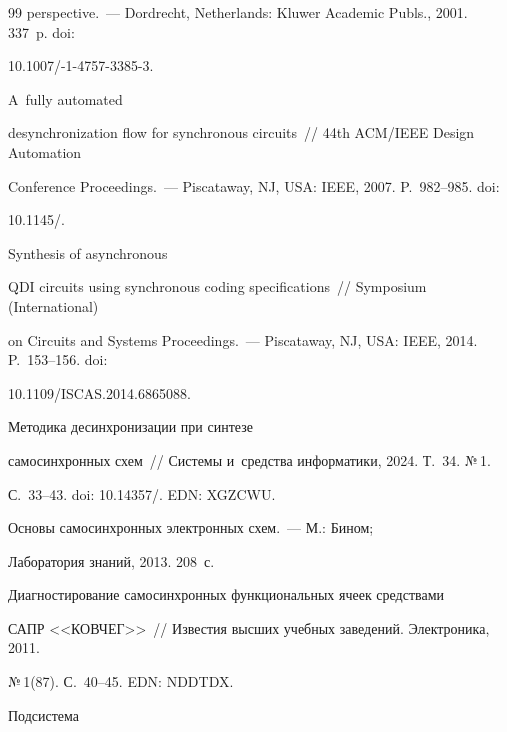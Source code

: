{{\begin{thebibliography}{99}
perspective.~--- Dordrecht, Netherlands: Kluwer Academic Publs., 2001. 337~p. doi: 

10.1007\!/-1-4757-3385-3.


 A~fully automated 

desynchronization flow for synchronous circuits~/\!\!/ 44th ACM\!/\!IEEE Design Automation 

Conference Proceedings.~--- Piscataway, NJ, USA: IEEE, 2007. P.~982--985. doi: 

10.1145\!/.


 Synthesis of asynchronous 

QDI circuits using synchronous coding specifications~/\!\!/ Symposium (International) 

on Circuits and Systems Proceedings.~--- Piscataway, NJ, USA: IEEE, 2014. P.~153--156. doi: 

10.1109\!/\!ISCAS.2014.6865088.


    Методика десинхронизации при синтезе 

самосинхронных схем~/\!\!/ Системы и~средства информатики, 2024. Т.~34. №\,1.  

С.~33--43. doi: 10.14357\!/. EDN: XGZCWU.


 Основы самосинхронных электронных схем.~--- М.: Бином; 

Лаборатория знаний, 2013. 208~с.


    Диагностирование самосинхронных функциональных ячеек средствами 

САПР <<КОВЧЕГ>>~/\!\!/ Известия высших учебных заведений. Электроника, 2011. 

№\,1(87). С.~40--45. EDN: NDDTDX.


 Под\-сис\-те\-ма 


\end{thebibliography}}}
